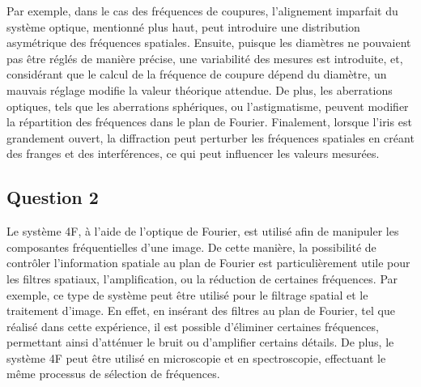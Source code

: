 \documentclass[11pt,letterpaper]{article}
\begin{document}
Par exemple, dans le cas des fréquences de coupures, l'alignement imparfait du système optique, mentionné plus haut, peut introduire une distribution asymétrique des fréquences spatiales. Ensuite, puisque les diamètres ne pouvaient pas être réglés de manière précise, une variabilité des mesures est introduite, et, considérant que le calcul de la fréquence de coupure dépend du diamètre, un mauvais réglage modifie la valeur théorique attendue. De plus, les aberrations optiques, tels que les aberrations sphériques, ou l'astigmatisme, peuvent modifier la répartition des fréquences dans le plan de Fourier. Finalement, lorsque l'iris est grandement ouvert, la diffraction peut perturber les fréquences spatiales en créant des franges et des interférences, ce qui peut influencer les valeurs mesurées.

\subsection{Question 2}
Le système 4F, à l'aide de l'optique de Fourier, est utilisé afin de manipuler les composantes fréquentielles d'une image. De cette manière, la possibilité de contrôler l'information spatiale au plan de Fourier est particulièrement utile pour les filtres spatiaux, l'amplification, ou la réduction de certaines fréquences. Par exemple, ce type de système peut être utilisé pour le filtrage spatial et le traitement d'image. En effet, en insérant des filtres au plan de Fourier, tel que réalisé dans cette expérience, il est possible d'éliminer certaines fréquences, permettant ainsi d'atténuer le bruit ou d'amplifier certains détails. De plus, le système 4F peut être utilisé en microscopie et en spectroscopie, effectuant le même processus de sélection de fréquences.
\end{document}
